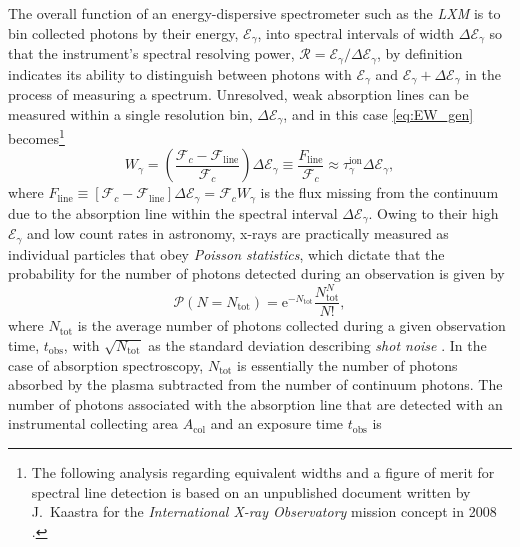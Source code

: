 The overall function of an energy-dispersive spectrometer such as the \emph{LXM} is to bin collected photons by their energy, $\mathcal{E}_{\gamma}$, into spectral intervals of width $\Delta \mathcal{E}_{\gamma}$ so that the instrument's spectral resolving power, $\mathscr{R} = \mathcal{E}_{\gamma} / \Delta \mathcal{E}_{\gamma}$, by definition indicates its ability to distinguish between photons with $\mathcal{E}_{\gamma}$ and $\mathcal{E}_{\gamma} + \Delta \mathcal{E}_{\gamma}$ in the process of measuring a spectrum. 
Unresolved, weak absorption lines can be measured within a single resolution bin, $\Delta \mathcal{E}_{\gamma}$, and in this case \cref{eq:EW_gen} becomes\footnote{The following analysis regarding equivalent widths and a figure of merit for spectral line detection is based on an unpublished document written by J.\ Kaastra for the \emph{International X-ray Observatory} mission concept in 2008 \cite{McEntaffer09,McEntaffer10}.} 
\begin{equation}\label{eq:EW_int}
 W_{\gamma} = \left( \frac{\mathcal{F}_c - \mathcal{F}_{\text{line}}}{\mathcal{F}_c} \right) \Delta \mathcal{E}_{\gamma} \equiv \frac{F_{\text{line}}}{\mathcal{F}_c} \approx \tau^{\text{ion}}_{\gamma} \Delta \mathcal{E}_{\gamma} ,
 \end{equation}
where $F_{\text{line}} \equiv \left[ \mathcal{F}_c - \mathcal{F}_{\text{line}} \right] \Delta \mathcal{E}_{\gamma} = \mathcal{F}_c W_{\gamma}$ is the flux missing from the continuum due to the absorption line within the spectral interval $\Delta \mathcal{E}_{\gamma}$. 
Owing to their high $\mathcal{E}_{\gamma}$ and low count rates in astronomy, x-rays are practically measured as individual particles that obey \emph{Poisson statistics}, which dictate that the probability for the number of photons detected during an observation is given by 
\begin{equation}\label{eq:poisson}
 \mathscr{P} \left( N=N_{\text{tot}} \right) = \mathrm{e}^{-N_{\text{tot}}} \frac{N^N_{\text{tot}}}{N!} ,
 \end{equation}
where $N_{\text{tot}}$ is the average number of photons collected during a given observation time, $t_{\text{obs}}$, with $\sqrt{N_{\text{tot}}}$ as the standard deviation describing \emph{shot noise} \cite{siemiginowska_2011,Sturge03}. 
In the case of absorption spectroscopy, $N_{\text{tot}}$ is essentially the number of photons absorbed by the plasma subtracted from the number of continuum photons. 
The number of photons associated with the absorption line that are detected with an instrumental collecting area $A_{\text{col}}$ and an exposure time $t_{\text{obs}}$ is 
